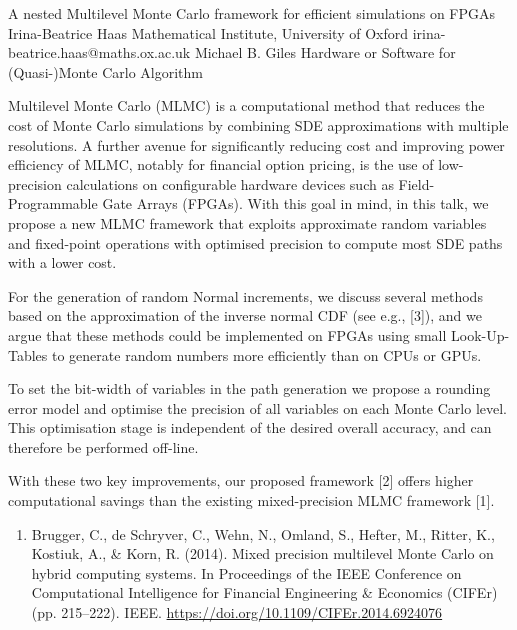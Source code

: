 \begin{talk}
  {A nested Multilevel Monte Carlo framework for efficient simulations on FPGAs}%
  {Irina-Beatrice Haas}%
  {Mathematical Institute, University of Oxford}%
  {irina-beatrice.haas@maths.ox.ac.uk}%
  {Michael B. Giles}%
  {Hardware or Software for (Quasi-)Monte Carlo Algorithm}%
    
   

Multilevel Monte Carlo (MLMC) is a computational method that reduces the cost of Monte Carlo simulations by combining SDE approximations with multiple resolutions. A further avenue for significantly reducing cost and improving power efficiency of MLMC, notably for financial option pricing, is the use of low-precision calculations on configurable hardware devices such as Field-Programmable Gate Arrays (FPGAs). With this goal in mind, in this talk, we propose a new MLMC framework that exploits approximate random variables and fixed-point operations with optimised precision to compute most SDE paths with a lower cost.

For the generation of random Normal increments, we discuss several methods based on the approximation of the inverse normal CDF (see e.g., [3]), and we argue that these methods could be implemented on FPGAs using small Look-Up-Tables to generate random numbers more efficiently than on CPUs or GPUs. 

To set the bit-width of variables in the path generation we propose a rounding error model and optimise the precision of all variables on each Monte Carlo level. This optimisation stage is independent of the desired overall accuracy, and can therefore be performed off-line. 

With these two key improvements, our proposed framework [2] offers higher computational
savings than the existing mixed-precision MLMC framework [1].


\medskip


\begin{enumerate}

    \item[{[1]}] Brugger, C., de Schryver, C., Wehn, N., Omland, S., Hefter, M., Ritter, K., Kostiuk, A., \& Korn, R. (2014). Mixed precision multilevel Monte Carlo on hybrid computing systems. In Proceedings of the IEEE Conference on Computational Intelligence for Financial Engineering \& Economics (CIFEr) (pp. 215--222). IEEE. \url{https://doi.org/10.1109/CIFEr.2014.6924076}
    

\end{enumerate}
\end{talk}
